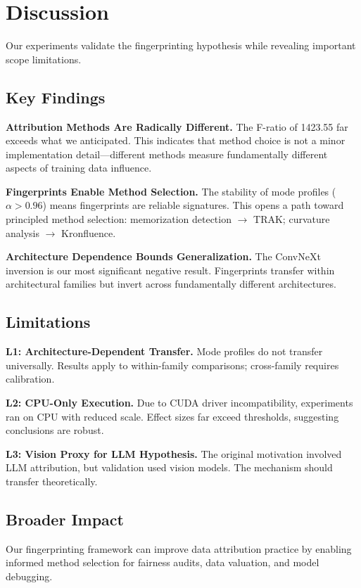 \section{Discussion}

Our experiments validate the fingerprinting hypothesis while revealing important scope limitations.

\subsection{Key Findings}

\textbf{Attribution Methods Are Radically Different.} The F-ratio of 1423.55 far exceeds what we anticipated. This indicates that method choice is not a minor implementation detail---different methods measure fundamentally different aspects of training data influence.

\textbf{Fingerprints Enable Method Selection.} The stability of mode profiles ($\alpha > 0.96$) means fingerprints are reliable signatures. This opens a path toward principled method selection: memorization detection $\rightarrow$ TRAK; curvature analysis $\rightarrow$ Kronfluence.

\textbf{Architecture Dependence Bounds Generalization.} The ConvNeXt inversion is our most significant negative result. Fingerprints transfer within architectural families but invert across fundamentally different architectures.

\subsection{Limitations}

\textbf{L1: Architecture-Dependent Transfer.} Mode profiles do not transfer universally. Results apply to within-family comparisons; cross-family requires calibration.

\textbf{L2: CPU-Only Execution.} Due to CUDA driver incompatibility, experiments ran on CPU with reduced scale. Effect sizes far exceed thresholds, suggesting conclusions are robust.

\textbf{L3: Vision Proxy for LLM Hypothesis.} The original motivation involved LLM attribution, but validation used vision models. The mechanism should transfer theoretically.

\subsection{Broader Impact}

Our fingerprinting framework can improve data attribution practice by enabling informed method selection for fairness audits, data valuation, and model debugging.
